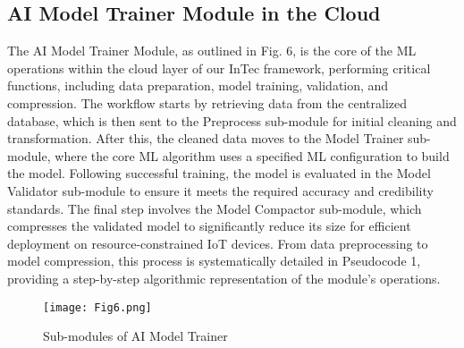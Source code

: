 \documentclass[11pt]{article}
\begin{document}
	\subsection{AI Model Trainer Module in the Cloud}
	The AI Model Trainer Module, as outlined in Fig. 6, is the core of the ML operations within the cloud layer of our InTec framework, performing critical functions,
	including data preparation, model training, validation, and compression. The workflow starts by retrieving data from the centralized database, which is then sent to
	the Preprocess sub-module for initial cleaning and transformation. After this, the
	cleaned data moves to the Model Trainer sub-module, where the core ML algorithm
	uses a specified ML configuration to build the model. Following successful training, the model is evaluated in the Model Validator sub-module to ensure it meets
	the required accuracy and credibility standards. The final step involves the Model Compactor sub-module, which compresses the validated model to significantly
	reduce its size for efficient deployment on resource-constrained IoT devices. From
	data preprocessing to model compression, this process is systematically detailed in
	Pseudocode 1, providing a step-by-step algorithmic representation of the module’s
	operations.
	
	\begin{figure}[t]
		\centering
		\texttt{[image: Fig6.png]}
		\caption{Sub-modules of AI Model Trainer}
	\end{figure}
	
\end{document}
